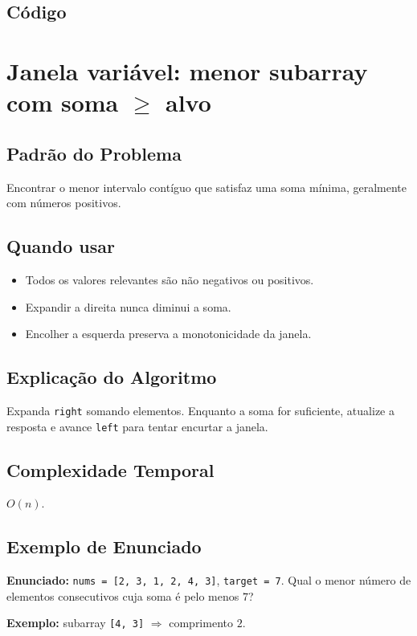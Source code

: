 \subsection{Código}

\section{Janela variável: menor subarray com soma $\geq$ alvo}

\subsection{Padrão do Problema}
Encontrar o menor intervalo contíguo que satisfaz uma soma mínima, geralmente com números positivos.

\subsection{Quando usar}
\begin{itemize}[nosep]
  \item Todos os valores relevantes são não negativos ou positivos.
  \item Expandir a direita nunca diminui a soma.
  \item Encolher a esquerda preserva a monotonicidade da janela.
\end{itemize}

\subsection{Explicação do Algoritmo}
Expanda \texttt{right} somando elementos. Enquanto a soma for suficiente, atualize a resposta e avance \texttt{left} para tentar encurtar a janela.

\subsection{Complexidade Temporal}
$O(n)$.

\subsection{Exemplo de Enunciado}
\begin{exemplodiabox}
\textbf{Enunciado:} \texttt{nums = [2, 3, 1, 2, 4, 3]}, \texttt{target = 7}. Qual o menor número de elementos consecutivos cuja soma é pelo menos $7$?

\textbf{Exemplo:} subarray \texttt{[4, 3]} $\Rightarrow$ comprimento $2$.
\end{exemplodiabox}

